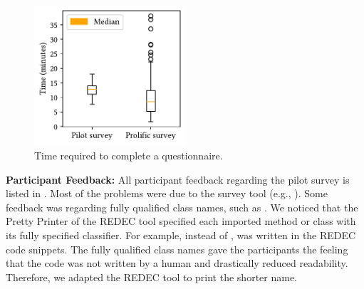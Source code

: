 \documentclass[%
class=scrreprt,
chapterprefix=false,%
open=right,%
twoside=true,%
paper=a4,%
logofile={Logo\_zentral\_farbig\_EN.png},%
thesistype=master,%
UKenglish,%
]{se2thesis}
\theoremstyle{definition}
\newcommand{\rdh}{REDEC\xspace}
\begin{document}
	\begin{figure}[tb]
		\centering
		\includegraphics[width=0.5\textwidth]{img/survey_times.pdf}
		\caption{Time required to complete a questionnaire.}
		\label{fig:survey_times}
	\end{figure}
		
	\textbf{Participant Feedback:}
    All participant feedback regarding the pilot survey is listed in .
    Most of the problems were due to the survey tool (e.g., ).
    Some feedback was regarding fully qualified class names, such as . We noticed that the Pretty Printer of the \rdh tool specified each imported method or class with its fully specified classifier. For example, instead of ,  was written in the \rdh code snippets. The fully qualified class names gave the participants the feeling that the code was not written by a human and drastically reduced readability. Therefore, we adapted the \rdh tool to print the shorter name.
	
\end{document}
